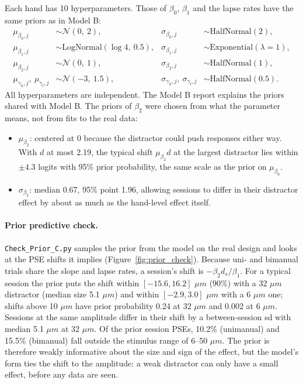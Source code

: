 \documentclass[11pt]{article}
\newcommand{\code}[1]{\texttt{#1}}
\begin{document}
Each hand has 10 hyperparameters. Those of $\beta_0$, $\beta_1$ and the lapse rates
have the same priors as in Model B:
\begin{align*}
  \mu_{\beta_0,j} &\sim \mathcal{N}(0,\ 2), &
  \sigma_{\beta_0,j} &\sim \text{HalfNormal}(2), \\
  \mu_{\beta_1,j} &\sim \text{LogNormal}(\log 4,\ 0.5), &
  \sigma_{\beta_1,j} &\sim \text{Exponential}(\lambda = 1), \\
  \mu_{\beta_2,j} &\sim \mathcal{N}(0,\ 1), &
  \sigma_{\beta_2,j} &\sim \text{HalfNormal}(1), \\
  \mu_{\gamma_h,j},\ \mu_{\gamma_l,j} &\sim \mathcal{N}(-3,\ 1.5), &
  \sigma_{\gamma_h,j},\ \sigma_{\gamma_l,j} &\sim \text{HalfNormal}(0.5).
\end{align*}
All hyperparameters are independent. The Model B report explains the priors shared
with Model B. The priors of $\beta_2$ were chosen from what the parameter means, not
from fits to the real data:
\begin{itemize}
  \item $\mu_{\beta_2}$: centered at 0 because the distractor could push responses
        either way. With $d$ at most 2.19, the typical shift $\mu_{\beta_2} d$ at the
        largest distractor lies within $\pm 4.3$ logits with 95\% prior probability,
        the same scale as the prior on $\mu_{\beta_0}$.
  \item $\sigma_{\beta_2}$: median 0.67, 95\% point 1.96, allowing sessions to differ
        in their distractor effect by about as much as the hand-level effect itself.
\end{itemize}

\paragraph{Prior predictive check.} \code{Check\_Prior\_C.py} samples the prior from the
model on the real design and looks at the PSE shifts it implies
(Figure~\ref{fig:prior_check}). Because uni- and bimanual trials share the slope and
lapse rates, a session's shift is $-\beta_2 d_s / \beta_1$. For a typical session the
prior puts the shift within $[-15.6, 16.2]$ $\mu m$ (90\%) with a 32 $\mu m$ distractor
(median size 5.1 $\mu m$) and within $[-2.9, 3.0]$ $\mu m$ with a 6 $\mu m$ one; shifts
above 10 $\mu m$ have prior probability 0.24 at 32 $\mu m$ and 0.002 at 6 $\mu m$.
Sessions at the same amplitude differ in their shift by a between-session sd with
median 5.1 $\mu m$ at 32 $\mu m$. Of the prior session PSEs, 10.2\% (unimanual) and
15.5\% (bimanual) fall outside the stimulus range of 6--50 $\mu m$. The prior is
therefore weakly informative about the size and sign of the effect, but the model's
form ties the shift to the amplitude: a weak distractor can only have a small effect,
before any data are seen.
\end{document}
